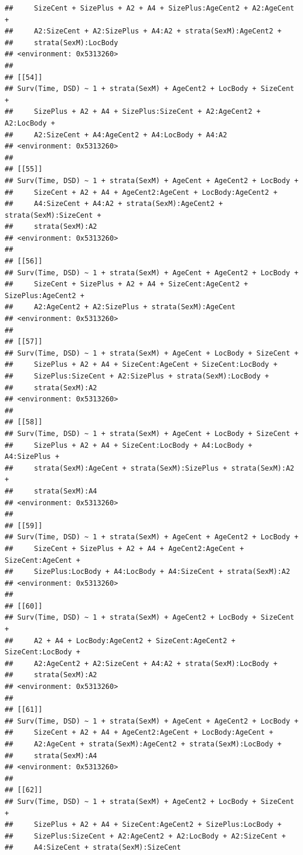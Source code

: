 \documentclass{article}\usepackage[]{graphicx}\usepackage[]{color}
\makeatletter
\newenvironment{kframe}{%
 \def\at@end@of@kframe{}%
 \ifinner\ifhmode%
  \def\at@end@of@kframe{\end{minipage}}%
  \begin{minipage}{\columnwidth}%
 \fi\fi%
 \def\FrameCommand##1{\hskip\@totalleftmargin \hskip-\fboxsep
 \colorbox{shadecolor}{##1}\hskip-\fboxsep
     \hskip-\linewidth \hskip-\@totalleftmargin \hskip\columnwidth}%
 \MakeFramed {\advance\hsize-\width
   \@totalleftmargin\z@ \linewidth\hsize
   \@setminipage}}%
 {\par\unskip\endMakeFramed%
 \at@end@of@kframe}
\newenvironment{knitrout}{}{} %
\makeatother
\begin{document}
\begin{knitrout}
\begin{kframe}
\begin{verbatim}
##     SizeCent + SizePlus + A2 + A4 + SizePlus:AgeCent2 + A2:AgeCent + 
##     A2:SizeCent + A2:SizePlus + A4:A2 + strata(SexM):AgeCent2 + 
##     strata(SexM):LocBody
## <environment: 0x5313260>
## 
## [[54]]
## Surv(Time, DSD) ~ 1 + strata(SexM) + AgeCent2 + LocBody + SizeCent + 
##     SizePlus + A2 + A4 + SizePlus:SizeCent + A2:AgeCent2 + A2:LocBody + 
##     A2:SizeCent + A4:AgeCent2 + A4:LocBody + A4:A2
## <environment: 0x5313260>
## 
## [[55]]
## Surv(Time, DSD) ~ 1 + strata(SexM) + AgeCent + AgeCent2 + LocBody + 
##     SizeCent + A2 + A4 + AgeCent2:AgeCent + LocBody:AgeCent2 + 
##     A4:SizeCent + A4:A2 + strata(SexM):AgeCent2 + strata(SexM):SizeCent + 
##     strata(SexM):A2
## <environment: 0x5313260>
## 
## [[56]]
## Surv(Time, DSD) ~ 1 + strata(SexM) + AgeCent + AgeCent2 + LocBody + 
##     SizeCent + SizePlus + A2 + A4 + SizeCent:AgeCent2 + SizePlus:AgeCent2 + 
##     A2:AgeCent2 + A2:SizePlus + strata(SexM):AgeCent
## <environment: 0x5313260>
## 
## [[57]]
## Surv(Time, DSD) ~ 1 + strata(SexM) + AgeCent + LocBody + SizeCent + 
##     SizePlus + A2 + A4 + SizeCent:AgeCent + SizeCent:LocBody + 
##     SizePlus:SizeCent + A2:SizePlus + strata(SexM):LocBody + 
##     strata(SexM):A2
## <environment: 0x5313260>
## 
## [[58]]
## Surv(Time, DSD) ~ 1 + strata(SexM) + AgeCent + LocBody + SizeCent + 
##     SizePlus + A2 + A4 + SizeCent:LocBody + A4:LocBody + A4:SizePlus + 
##     strata(SexM):AgeCent + strata(SexM):SizePlus + strata(SexM):A2 + 
##     strata(SexM):A4
## <environment: 0x5313260>
## 
## [[59]]
## Surv(Time, DSD) ~ 1 + strata(SexM) + AgeCent + AgeCent2 + LocBody + 
##     SizeCent + SizePlus + A2 + A4 + AgeCent2:AgeCent + SizeCent:AgeCent + 
##     SizePlus:LocBody + A4:LocBody + A4:SizeCent + strata(SexM):A2
## <environment: 0x5313260>
## 
## [[60]]
## Surv(Time, DSD) ~ 1 + strata(SexM) + AgeCent2 + LocBody + SizeCent + 
##     A2 + A4 + LocBody:AgeCent2 + SizeCent:AgeCent2 + SizeCent:LocBody + 
##     A2:AgeCent2 + A2:SizeCent + A4:A2 + strata(SexM):LocBody + 
##     strata(SexM):A2
## <environment: 0x5313260>
## 
## [[61]]
## Surv(Time, DSD) ~ 1 + strata(SexM) + AgeCent + AgeCent2 + LocBody + 
##     SizeCent + A2 + A4 + AgeCent2:AgeCent + LocBody:AgeCent + 
##     A2:AgeCent + strata(SexM):AgeCent2 + strata(SexM):LocBody + 
##     strata(SexM):A4
## <environment: 0x5313260>
## 
## [[62]]
## Surv(Time, DSD) ~ 1 + strata(SexM) + AgeCent2 + LocBody + SizeCent + 
##     SizePlus + A2 + A4 + SizeCent:AgeCent2 + SizePlus:LocBody + 
##     SizePlus:SizeCent + A2:AgeCent2 + A2:LocBody + A2:SizeCent + 
##     A4:SizeCent + strata(SexM):SizeCent

\end{verbatim}
\end{kframe}
\end{knitrout}
\end{document}

